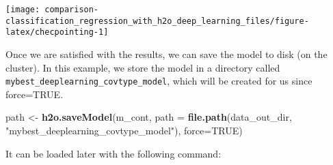 \documentclass[]{book}
\newenvironment{Shaded}{\begin{snugshade}}{\end{snugshade}}
\newcommand{\DataTypeTok}[1]{\textcolor[rgb]{0.13,0.29,0.53}{#1}}
\newcommand{\KeywordTok}[1]{\textcolor[rgb]{0.13,0.29,0.53}{\textbf{#1}}}
\newcommand{\NormalTok}[1]{#1}
\newcommand{\OtherTok}[1]{\textcolor[rgb]{0.56,0.35,0.01}{#1}}
\newcommand{\StringTok}[1]{\textcolor[rgb]{0.31,0.60,0.02}{#1}}
\begin{document}
\begin{center}\texttt{[image: comparison-classification\_regression\_with\_h2o\_deep\_learning\_files/figure-latex/checpointing-1]} \end{center}

Once we are satisfied with the results, we can save the model to disk (on the cluster). In this example, we store the model in a directory called \texttt{mybest\_deeplearning\_covtype\_model}, which will be created for us since force=TRUE.

\begin{Shaded}
\begin{Highlighting}[]
\NormalTok{path <-}\StringTok{ }\KeywordTok{h2o.saveModel}\NormalTok{(m_cont, }
          \DataTypeTok{path =} \KeywordTok{file.path}\NormalTok{(data_out_dir, }\StringTok{"mybest_deeplearning_covtype_model"}\NormalTok{), }\DataTypeTok{force=}\OtherTok{TRUE}\NormalTok{)}
\end{Highlighting}
\end{Shaded}

It can be loaded later with the following command:
\end{document}
